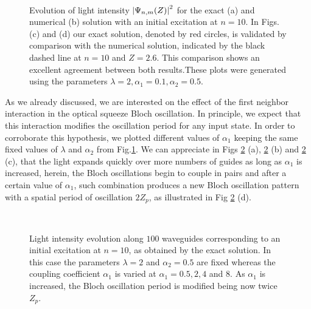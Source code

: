 \documentclass[12pt]{article}
\numberwithin{equation}{section}
\begin{document}
\begin{figure}[H]
\\
\caption{
	Evolution of light intensity $\abs{\Psi_{n,m}(Z)}^2$ for the exact (a) and numerical (b) solution with an initial excitation at $n=10$. In Figs.(c) and (d) our exact solution, denoted by red circles, is validated by comparison with the numerical solution, indicated by the black dashed line at $n=10$ and $Z=2.6$. This comparison shows an excellent agreement between both results.These plots were generated using the parameters $\lambda=2, \alpha_1=0.1, \alpha_2=0.5$.}
\label{f2}
\end{figure}
As we already discussed, we are interested on the effect of the first neighbor interaction in the optical squeeze Bloch oscillation. In principle, we expect that this interaction modifies the oscillation period for any input state. In order to corroborate this hypothesis, we plotted different values of $\alpha_{1}$ keeping the same fixed values of $\lambda$ and  $\alpha_{2}$ from Fig.\ref{f2}. We can appreciate in Figs \ref{f3} (a), \ref{f3} (b) and \ref{f3} (c), that the light expands quickly over more numbers of guides as long as $\alpha_{1}$ is increased, herein, the Bloch oscillations begin to couple in pairs and after a certain value of $\alpha_{1}$, such combination produces a new Bloch oscillation pattern with a spatial period of oscillation $2Z_{p}$, as illustrated in Fig \ref{f3} (d). 
\begin{figure}[H]
	 \\
	\caption{Light intensity evolution along $100$ waveguides corresponding to an initial excitation at $n=10$, as obtained by the exact solution. In this case the parameters $\lambda=2$ and $\alpha_{2}=0.5$ are fixed whereas the coupling coefficient $\alpha_{1}$ is varied at $\alpha_{1}=0.5,2,4$ and $8$. As $\alpha_{1}$ is increased, the Bloch oscillation period is modified being now twice $Z_{p}$.}
	\label{f3}
\end{figure}
\end{document}
